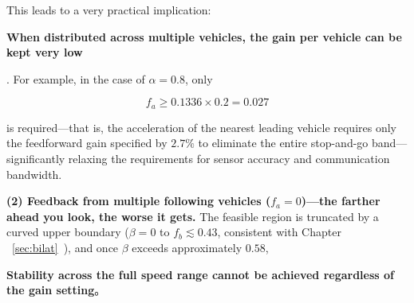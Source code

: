 \documentclass[11pt,a4paper,openany]{book}
\numberwithin{equation}{chapter}
\numberwithin{figure}{chapter}
\numberwithin{table}{chapter}
\begin{document}
This leads to a very practical implication:




\textbf{When distributed across multiple vehicles, the gain per vehicle can be kept very low}




. For example, in the case of $\alpha=0.8$, only

\begin{equation}
f_a \ge 0.1336\times0.2 = 0.027
\end{equation}

is required—that is, the acceleration of the nearest leading vehicle requires only the feedforward gain specified by $2.7\%$ to eliminate the entire stop-and-go band—significantly relaxing the requirements for sensor accuracy and communication bandwidth.










\textbf{(2) Feedback from multiple following vehicles ($f_a=0$)—the farther ahead you look, the worse it gets.} The feasible region is truncated by a curved upper boundary ($\beta=0$ to $f_b\lesssim0.43$, consistent with Chapter ~\ref{sec:bilat}~), and once $\beta$ exceeds approximately $0.58$,




\textbf{Stability across the full speed range cannot be achieved regardless of the gain setting}。
\end{document}
